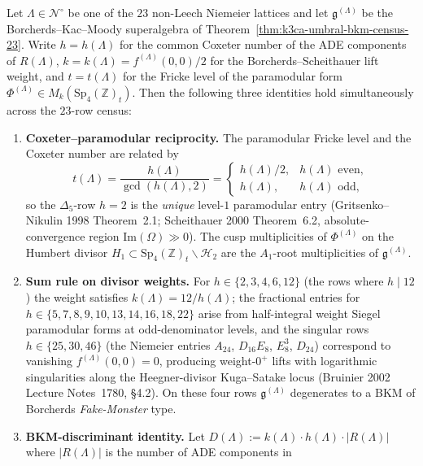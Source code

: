 \begin{theorem}
\label{thm:k3ca-umbral-coxeter-paramodular-reciprocity}
Let $\Lambda\in\mathscr N^\circ$ be one of the $23$ non-Leech
Niemeier lattices and let $\mathfrak g^{(\Lambda)}$ be the
Borcherds--Kac--Moody superalgebra of
Theorem~\ref{thm:k3ca-umbral-bkm-census-23}. Write $h=h(\Lambda)$
for the common Coxeter number of the ADE components of
$R(\Lambda)$, $k=k(\Lambda)=f^{(\Lambda)}(0,0)/2$ for the
Borcherds--Scheithauer lift weight, and
$t=t(\Lambda)$ for the Fricke level of the paramodular
form $\Phi^{(\Lambda)}\in M_k(\mathrm{Sp}_4(\mathbb Z)_t)$.
Then the following three identities hold simultaneously across
the $23$-row census:
\begin{enumerate}
 \item \textbf{Coxeter--paramodular reciprocity.} The paramodular
 Fricke level and the Coxeter number are related by
 \[
 t(\Lambda)=\frac{h(\Lambda)}{\gcd(h(\Lambda),2)}
 =\begin{cases} h(\Lambda)/2,& h(\Lambda)\text{ even},\\ h(\Lambda),& h(\Lambda)\text{ odd},\end{cases}
 \]
 so the $\Delta_5$-row $h=2$ is the \emph{unique} level-$1$
 paramodular entry (Gritsenko--Nikulin 1998 Theorem~2.1;
 Scheithauer 2000 Theorem~6.2, absolute-convergence region
 $\mathrm{Im}(\Omega)\gg 0$). The cusp multiplicities of
 $\Phi^{(\Lambda)}$ on the Humbert divisor
 $H_1\subset\mathrm{Sp}_4(\mathbb Z)_t\backslash\mathcal H_2$
 are the $A_1$-root multiplicities of $\mathfrak g^{(\Lambda)}$.
 \item \textbf{Sum rule on divisor weights.} For $h\in\{2,3,4,6,12\}$
 (the rows where $h\mid 12$) the weight satisfies
 $k(\Lambda)=12/h(\Lambda)$; the fractional entries for
 $h\in\{5,7,8,9,10,13,14,16,18,22\}$ arise from half-integral
 weight Siegel paramodular forms at odd-denominator levels, and
 the singular rows $h\in\{25,30,46\}$ (the Niemeier
 entries $A_{24}$, $D_{16}E_8$, $E_8^3$, $D_{24}$) correspond
 to vanishing $f^{(\Lambda)}(0,0)=0$, producing weight-$0^+$
 lifts with logarithmic singularities along the
 Heegner-divisor Kuga--Satake locus (Bruinier 2002 Lecture
 Notes~1780, \S4.2). On these four rows
 $\mathfrak g^{(\Lambda)}$ degenerates to a BKM of Borcherds
 \emph{Fake-Monster} type.
 \item \textbf{BKM-discriminant identity.} Let
 $D(\Lambda):=k(\Lambda)\cdot h(\Lambda)\cdot|R(\Lambda)|$
 where $|R(\Lambda)|$ is the number of ADE components in

\end{enumerate}
\end{theorem}
